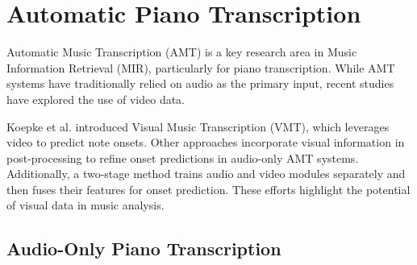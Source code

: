 \documentclass{article}
\begin{document}

\section{Automatic Piano Transcription}\label{sec:transcription}
Automatic Music Transcription (AMT) is a key research area in Music Information Retrieval (MIR), particularly for piano transcription. While AMT systems have traditionally relied on audio as the primary input, recent studies have explored the use of video data.

Koepke et al. \cite{Koepke} introduced Visual Music Transcription (VMT), which leverages video to predict note onsets. Other approaches incorporate visual information in post-processing to refine onset predictions in audio-only AMT systems. Additionally, a two-stage method trains audio and video modules separately and then fuses their features for onset prediction. These efforts highlight the potential of visual data in music analysis.

\subsection{Audio-Only Piano Transcription}
\end{document}
